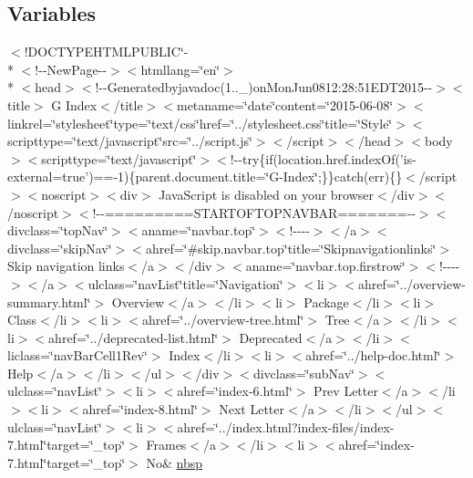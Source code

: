 \subsection*{Variables}
\begin{DoxyCompactItemize}
\item 
$<$!D\-O\-C\-T\-Y\-P\-E\-H\-T\-M\-L\-P\-U\-B\-L\-I\-C\char`\"{}-\/\\*
$<$!-\/-\/New\-Page-\/-\/$>$$<$htmllang=\char`\"{}en\char`\"{}$>$\\*
$<$head$>$$<$!-\/-\/Generatedbyjavadoc(1..\-\_)on\-Mon\-Jun0812\-:28\-:51\-E\-D\-T2015-\/-\/$>$$<$title$>$ G Index$<$/title$>$$<$metaname=\char`\"{}date\char`\"{}content=\char`\"{}2015-\/06-\/08\char`\"{}$>$$<$linkrel=\char`\"{}stylesheet\char`\"{}type=\char`\"{}text/css\char`\"{}href=\char`\"{}../stylesheet.\-css\char`\"{}title=\char`\"{}\-Style\char`\"{}$>$$<$scripttype=\char`\"{}text/javascript\char`\"{}src=\char`\"{}../script.\-js\char`\"{}$>$$<$/script$>$$<$/head$>$$<$body$>$$<$scripttype=\char`\"{}text/javascript\char`\"{}$>$$<$!-\/-\/try\{if(location.\-href.\-index\-Of('is-\/external=true')==-\/1)\{parent.\-document.\-title=\char`\"{}\-G-\/\-Index\char`\"{};\}\}catch(err)\{\}$<$/script$>$$<$noscript$>$$<$div$>$ Java\-Script is disabled on your browser$<$/div$>$$<$/noscript$>$$<$!-\/-\/=========\-S\-T\-A\-R\-T\-O\-F\-T\-O\-P\-N\-A\-V\-B\-A\-R=======-\/-\/$>$$<$divclass=\char`\"{}top\-Nav\char`\"{}$>$$<$aname=\char`\"{}navbar.\-top\char`\"{}$>$$<$!-\/-\/-\/-\/$>$$<$/a$>$$<$divclass=\char`\"{}skip\-Nav\char`\"{}$>$$<$ahref=\char`\"{}\#skip.\-navbar.\-top\char`\"{}title=\char`\"{}\-Skipnavigationlinks\char`\"{}$>$ Skip navigation links$<$/a$>$$<$/div$>$$<$aname=\char`\"{}navbar.\-top.\-firstrow\char`\"{}$>$$<$!-\/-\/-\/-\/$>$$<$/a$>$$<$ulclass=\char`\"{}nav\-List\char`\"{}title=\char`\"{}\-Navigation\char`\"{}$>$$<$li$>$$<$ahref=\char`\"{}../overview-\/summary.\-html\char`\"{}$>$ Overview$<$/a$>$$<$/li$>$$<$li$>$ Package$<$/li$>$$<$li$>$ Class$<$/li$>$$<$li$>$$<$ahref=\char`\"{}../overview-\/tree.\-html\char`\"{}$>$ Tree$<$/a$>$$<$/li$>$$<$li$>$$<$ahref=\char`\"{}../deprecated-\/list.\-html\char`\"{}$>$ Deprecated$<$/a$>$$<$/li$>$$<$liclass=\char`\"{}nav\-Bar\-Cell1\-Rev\char`\"{}$>$ Index$<$/li$>$$<$li$>$$<$ahref=\char`\"{}../help-\/doc.\-html\char`\"{}$>$ Help$<$/a$>$$<$/li$>$$<$/ul$>$$<$/div$>$$<$divclass=\char`\"{}sub\-Nav\char`\"{}$>$$<$ulclass=\char`\"{}nav\-List\char`\"{}$>$$<$li$>$$<$ahref=\char`\"{}index-\/6.\-html\char`\"{}$>$ Prev Letter$<$/a$>$$<$/li$>$$<$li$>$$<$ahref=\char`\"{}index-\/8.\-html\char`\"{}$>$ Next Letter$<$/a$>$$<$/li$>$$<$/ul$>$$<$ulclass=\char`\"{}nav\-List\char`\"{}$>$$<$li$>$$<$ahref=\char`\"{}../index.\-html?index-\/files/index-\/7.\-html\char`\"{}target=\char`\"{}\-\_\-top\char`\"{}$>$ Frames$<$/a$>$$<$/li$>$$<$li$>$$<$ahref=\char`\"{}index-\/7.\-html\char`\"{}target=\char`\"{}\-\_\-top\char`\"{}$>$ No\& \hyperlink{index-7_8html_a479d00f21dbca369efe3be97f1ef785a}{nbsp}
\end{DoxyCompactItemize}


